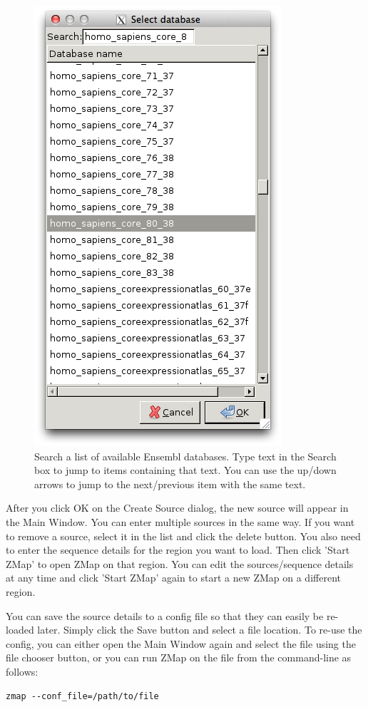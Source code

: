 \documentclass[letterpaper]{article}
\begin{document}
\begin{figure}
\centering
\color[rgb]{0.30980393,0.5058824,0.7411765}
\includegraphics[resolution=150]{img_create_source_ensembl_search_db.png}
\caption{Search a list of available Ensembl databases. Type text in the Search box to jump to items containing that text. You can use the up/down arrows to jump to the next/previous item with the same text.}
\label{img_create_source_ensembl_search_db}
\end{figure}

After you click OK on the Create Source dialog, the new source will appear in the Main Window. You can enter multiple sources in the same way. If you want to remove a source, select it in the list and click the delete button. You also need to enter the sequence details for the region you want to load. Then click 'Start ZMap' to open ZMap on that region. You can edit the sources/sequence details at any time and click 'Start ZMap' again to start a new ZMap on a different region.

You can save the source details to a config file so that they can easily be re-loaded later. Simply click the Save button and select a file location. To re-use the config, you can either open the Main Window again and select the file using the file chooser button, or you can run ZMap on the file from the command-line as follows:
\begin{verbatim}
zmap --conf_file=/path/to/file
\end{verbatim}
\end{document}
